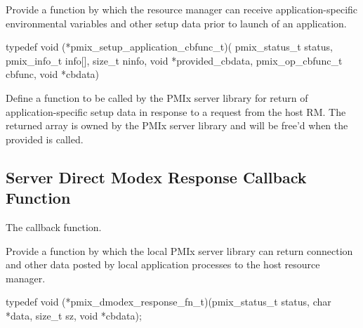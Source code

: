 \summary

Provide a function by which the resource manager can receive application-specific environmental variables and other setup data prior to launch of an application.

\format

\cspecificstart
\begin{codepar}
typedef void (*pmix_setup_application_cbfunc_t)(
                        pmix_status_t status,
                        pmix_info_t info[], size_t ninfo,
                        void *provided_cbdata,
                        pmix_op_cbfunc_t cbfunc, void *cbdata)
\end{codepar}
\cspecificend

\begin{arglist}
\end{arglist}

\descr

Define a function to be called by the \ac{PMIx} server library for return of application-specific setup data in response to a request from the host \ac{RM}. The returned  array is owned by the \ac{PMIx} server library and will be free'd when the provided  is called.


\subsection{Server Direct Modex Response Callback Function}

The  callback function.

\summary

Provide a function by which the local \ac{PMIx} server library can return connection and other data posted by local application processes to the host resource manager.

\format

\cspecificstart
\begin{codepar}
typedef void (*pmix_dmodex_response_fn_t)(pmix_status_t status,
                        char *data, size_t sz,
                        void *cbdata);
\end{codepar}
\cspecificend


